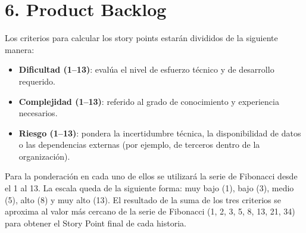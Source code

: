 \documentclass[
11pt, %
]{charter}
\begin{document}
\section{6. Product Backlog}
\label{sec:backlog}

Los criterios para calcular los story points estarán divididos de la siguiente manera:
\begin{itemize}
	\item \textbf{Dificultad (1–13)}: evalúa el nivel de esfuerzo técnico y de desarrollo requerido.
	\item \textbf{Complejidad (1–13)}: referido al grado de conocimiento y experiencia necesarios.
	\item \textbf{Riesgo (1–13)}: pondera la incertidumbre técnica, la disponibilidad de datos o las dependencias externas (por ejemplo, de terceros dentro de la organización).
\end{itemize}

Para la ponderación en cada uno de ellos se utilizará la serie de Fibonacci desde el 1 al 13. La escala queda de la siguiente forma: muy bajo (1), bajo (3), medio (5), alto (8) y muy alto (13). El resultado de la suma de los tres criterios se aproxima al valor más cercano de la serie de Fibonacci (1, 2, 3, 5, 8, 13, 21, 34) para obtener el Story Point final de cada historia.
\end{document}
